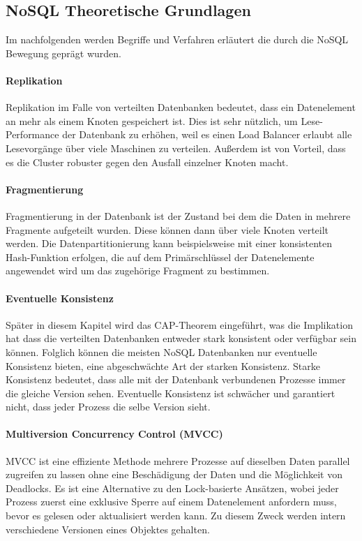 \subsection{NoSQL Theoretische Grundlagen}
\label{ch:grundlagen:sec:NoSQL:NoSQLBasics}

Im nachfolgenden werden Begriffe und Verfahren erläutert die durch die NoSQL Bewegung geprägt wurden.

\paragraph{Replikation} Replikation im Falle von verteilten Datenbanken bedeutet, dass ein Datenelement an mehr als einem Knoten gespeichert ist. Dies ist sehr nützlich, um Lese-Performance der Datenbank zu erhöhen, weil es einen Load Balancer erlaubt alle Lesevorgänge über viele Maschinen zu verteilen. Außerdem ist von Vorteil, dass es die Cluster robuster gegen den Ausfall einzelner Knoten macht.

\paragraph{Fragmentierung} Fragmentierung in der Datenbank ist der Zustand bei dem die Daten in mehrere Fragmente aufgeteilt wurden. Diese können dann über viele Knoten verteilt werden. Die Datenpartitionierung kann beispielsweise mit einer konsistenten Hash-Funktion erfolgen, die auf dem Primärschlüssel der Datenelemente angewendet wird um das zugehörige Fragment zu bestimmen.

\paragraph{Eventuelle Konsistenz} Später in diesem Kapitel wird das CAP-Theorem eingeführt, was die Implikation hat
dass die verteilten Datenbanken entweder stark konsistent oder verfügbar sein können. Folglich können die meisten NoSQL Datenbanken nur eventuelle Konsistenz bieten, eine abgeschwächte Art der starken Konsistenz. Starke Konsistenz bedeutet, dass alle mit der Datenbank verbundenen Prozesse immer die gleiche Version sehen. Eventuelle Konsistenz ist schwächer und garantiert nicht, dass jeder Prozess die selbe Version sieht.

\paragraph{Multiversion Concurrency Control (MVCC)} MVCC ist eine effiziente Methode mehrere Prozesse auf dieselben Daten parallel zugreifen zu lassen ohne eine Beschädigung der Daten und die Möglichkeit von Deadlocks. Es ist eine Alternative zu den Lock-basierte Ansätzen, wobei jeder Prozess zuerst eine exklusive Sperre auf einem Datenelement anfordern muss, bevor es gelesen oder aktualisiert werden kann. Zu diesem Zweck werden intern verschiedene Versionen eines Objektes gehalten.

